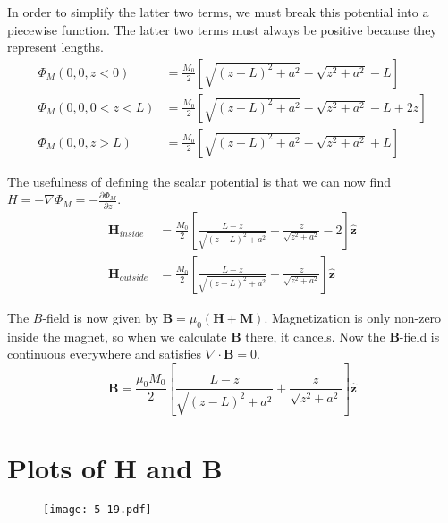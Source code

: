 \documentclass[10pt,a4paper]{article}
\begin{document}
In order to simplify the latter two terms, we must break this potential into a piecewise function.  The latter two terms must always be positive because they represent lengths.
\begin{align}
\Phi_M(0, 0, z<0)&=\frac{M_0}{2}\left[\sqrt{(z-L)^2+a^2}-\sqrt{z^2+a^2}-L\right] \\
\Phi_M(0, 0, 0<z<L)&=\frac{M_0}{2}\left[\sqrt{(z-L)^2+a^2}-\sqrt{z^2+a^2}-L+2z\right] \\
\Phi_M(0, 0, z>L)&=\frac{M_0}{2}\left[\sqrt{(z-L)^2+a^2}-\sqrt{z^2+a^2}+L\right]
\end{align}

The usefulness of defining the scalar potential is that we can now find $H=-\nabla\Phi_M=-\frac{\partial\Phi_M}{\partial z}$.
\begin{align}
\mathbf{H}_{inside}&=\frac{M_0}{2}\left[\frac{L-z}{\sqrt{(z-L)^2+a^2}}+\frac{z}{\sqrt{z^2+a^2}}-2\right]\mathbf{\hat{z}} \\
\mathbf{H}_{outside}&=\frac{M_0}{2}\left[\frac{L-z}{\sqrt{(z-L)^2+a^2}}+\frac{z}{\sqrt{z^2+a^2}}\right]\mathbf{\hat{z}}
\end{align}

The $B$-field is now given by $\mathbf{B}=\mu_0(\mathbf{H}+\mathbf{M})$.  Magnetization is only non-zero inside the magnet, so when we calculate $\mathbf{B}$ there, it cancels.  Now the $\mathbf{B}$-field is continuous everywhere and satisfies $\nabla \cdot \mathbf{B}=0$.
\begin{equation}
\mathbf{B}=\frac{\mu_0 M_0}{2}\left[\frac{L-z}{\sqrt{(z-L)^2+a^2}}+\frac{z}{\sqrt{z^2+a^2}}\right]\mathbf{\hat{z}}
\end{equation}

\section{Plots of \textbf{H} and \textbf{B}}
\begin{figure}[h]
\texttt{[image: 5-19.pdf]}
\end{figure}
\end{document}
